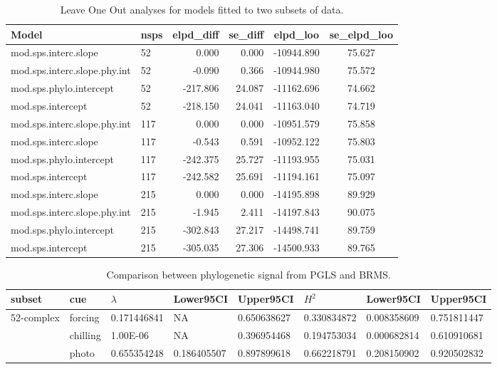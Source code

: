 \documentclass{article}\usepackage[]{graphicx}\usepackage[]{color}
\begin{document}
\begin{table}[H]
  \begin{center}

\caption{Leave One Out analyses for models fitted to two subsets of data.}
\begin{tabular}{@{}llrrcc@{}}
\toprule
Model                        & nsps & elpd\_diff & se\_diff & elpd\_loo  & se\_elpd\_loo \\ \midrule
mod.sps.interc.slope         & 52   & 0.000      & 0.000    & -10944.890 & 75.627        \\
mod.sps.interc.slope.phy.int & 52   & -0.090     & 0.366    & -10944.980 & 75.572        \\
mod.sps.phylo.intercept      & 52   & -217.806   & 24.087   & -11162.696 & 74.662        \\
mod.sps.intercept            & 52   & -218.150   & 24.041   & -11163.040 & 74.719        \\
mod.sps.interc.slope.phy.int & 117  & 0.000      & 0.000    & -10951.579 & 75.858        \\
mod.sps.interc.slope         & 117  & -0.543     & 0.591    & -10952.122 & 75.803        \\
mod.sps.phylo.intercept      & 117  & -242.375   & 25.727   & -11193.955 & 75.031        \\
mod.sps.intercept            & 117  & -242.582   & 25.691   & -11194.161 & 75.097        \\
mod.sps.interc.slope         & 215  & 0.000      & 0.000    & -14195.898 & 89.929        \\
mod.sps.interc.slope.phy.int & 215  & -1.945     & 2.411    & -14197.843 & 90.075        \\
mod.sps.phylo.intercept      & 215  & -302.843   & 27.217   & -14498.741 & 89.759        \\
mod.sps.intercept            & 215  & -305.035   & 27.306   & -14500.933 & 89.765        \\ \bottomrule
\end{tabular}
 \label{table:lootable}
   \end{center}
\end{table}

\begin{table}[H]
\begin{center}
\caption{Comparison between phylogenetic signal from PGLS and BRMS.}
\begin{tabular}{@{}llllllll@{}}
\toprule
subset     & cue      & $\lambda$      & Lower95CI   & Upper95CI   & $H^2$          & Lower95CI   & Upper95CI   \\ \midrule
52-complex & forcing  & 0.171446841 & NA          & 0.650638627 & 0.330834872 & 0.008358609 & 0.751811447 \\
           & chilling & 1.00E-06    & NA          & 0.396954468 & 0.194753034 & 0.000682814 & 0.610910681 \\
           & photo    & 0.655354248 & 0.186405507 & 0.897899618 & 0.662218791 & 0.208150902 & 0.920502832 \\ \bottomrule
\end{tabular}
 \label{table:phylosigtable}
\end{center}
\end{table}
\end{document}
